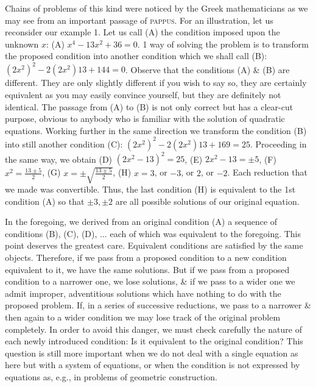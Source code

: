 \documentclass[oneside]{book}
\numberwithin{equation}{section}
\begin{document}
Chains of problems of this kind were noticed by the Greek mathematicians as we may see from an important passage of \textsc{pappus}. For an illustration, let us reconsider our example 1. Let us call (A) the condition imposed upon the unknown $x$: (A) $x^4 - 13x^2 + 36 = 0$. 1 way of solving the problem is to transform the proposed condition into another condition which we shall call (B): $(2x^2)^2 - 2(2x^2)13 + 144 = 0$. Observe that the conditions (A) \& (B) are different. They are only slightly different if you wish to say so, they are certainly equivalent as you may easily convince yourself, but they are definitely not identical. The passage from (A) to (B) is not only correct but has a clear-cut purpose, obvious to anybody who is familiar with the solution of quadratic equations. Working further in the same direction we transform the condition (B) into still another condition (C): $(2x^2)^2 - 2(2x^2)13 + 169 = 25$. Proceeding in the same way, we obtain (D) $(2x^2 - 13)^2 = 25$, (E) $2x^2 - 13 = \pm5$, (F) $x^2 = \frac{13\pm5}{2}$, (G) $x = \pm\sqrt{\frac{13\pm5}{2}}$, (H) $x = 3$, or $-3$, or $2$, or $-2$. Each reduction that we made was convertible. Thus, the last condition (H) is equivalent to the 1st condition (A) so that $\pm3,\pm2$ are all possible solutions of our original equation.

In the foregoing, we derived from an original condition (A) a sequence of conditions (B), (C), (D), $\ldots$ each of which was equivalent to the foregoing. This point deserves the greatest care. Equivalent conditions are satisfied by the same objects. Therefore, if we pass from a proposed condition to a new condition equivalent to it, we have the same solutions. But if we pass from a proposed condition to a narrower one, we lose solutions, \& if we pass to a wider one we admit improper, adventitious solutions which have nothing to do with the proposed problem. If, in a series of successive reductions, we pass to a narrower \& then again to a wider condition we may lose track of the original problem completely. In order to avoid this danger, we must check carefully the nature of each newly introduced condition: Is it equivalent to the original condition? This question is still more important when we do not deal with a single equation as here but with a system of equations, or when the condition is not expressed by equations as, e.g., in problems of geometric construction.
\end{document}
